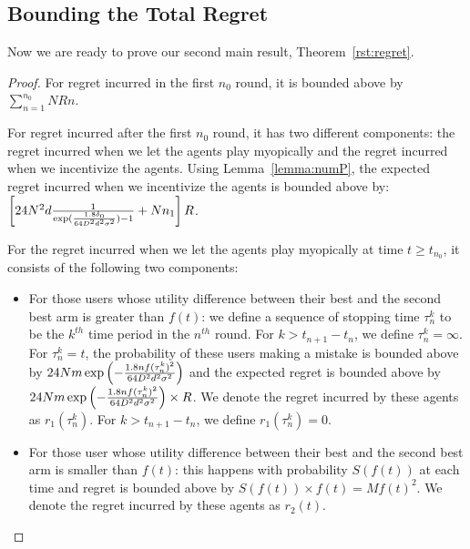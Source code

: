 \subsection{Bounding the Total Regret}

Now we are ready to prove our second main result, Theorem~\ref{rst:regret}.

\begin{proof}
For regret incurred in the first $n_0$ round, it is bounded above by $\sum_{n=1}^{n_{0}}NRn$.

For regret incurred after the first $n_0$ round, it has two different components: the regret incurred when we let the agents play myopically and the regret incurred when we incentivize the agents. Using Lemma~\ref{lemma:numP}, the expected regret incurred when we incentivize the agents is bounded above by: $\left[24N^2 d \frac{1}{\exp(\frac{1.8\delta_{0}}{64D^2 d^2\sigma^2})-1} + Nn_1\right]R$.

For the regret incurred when we let the agents play myopically at time $t\geq t_{n_0}$, it consists of the following two components:
\begin{itemize}
\item For those users whose utility difference between their best and the second best arm is greater than $f(t)$: we define a sequence of stopping time $\tau_{n}^{k}$ to be the $k^{th}$ time period in the $n^{th}$ round. For $k>t_{n+1}-t_{n}$, we define $\tau_{n}^{k}=\infty$. For $\tau_{n}^{k}=t$, the probability of these users making a mistake is bounded above by $24Nm\exp\left(-\frac{1.8n f(\tau_{n}^{k})^2}{64 D^2 d^2\sigma^2}\right)$ and the expected regret is bounded above by $24Nm\exp\left(-\frac{1.8n f(\tau_{n}^{k})^2}{64 D^2 d^2\sigma^2}\right)\times R$. We denote the regret incurred by these agents as $r_1(\tau_{n}^{k})$. For $k>t_{n+1}-t_{n}$, we define $r_1(\tau_{n}^{k})=0$.
\item For those user whose utility difference between their best and the second best arm is smaller than $f(t)$: this happens with probability $S(f(t))$ at each time and regret is bounded above by $S(f(t)) \times f(t)=Mf(t)^2$. We denote the regret incurred by these agents as $r_2(t)$.
\end{itemize}


\end{proof}

